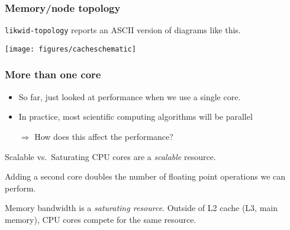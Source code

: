 \documentclass[presentation,aspectratio=43,10pt]{beamer}
\begin{document}
\begin{frame}
\begin{center}
  \end{center}
\end{frame}
\begin{frame}
  \frametitle{Memory/node topology}
  \texttt{likwid-topology} reports an ASCII version of diagrams like
  this.
  \begin{center}
    \texttt{[image: figures/cacheschematic]}
  \end{center}
\end{frame}

\begin{frame}
  \frametitle{More than one core}
  \begin{itemize}
  \item So far, just looked at performance when we use a single core.
  \item In practice, most scientific computing algorithms will be
    parallel
  \item[$\Rightarrow$] How does this affect the performance?
  \end{itemize}

  \begin{answer}{Scalable vs.~Saturating}
    CPU cores are a \emph{scalable} resource.

    Adding a second core doubles the number of floating point
    operations we can perform.

    Memory bandwidth is a \emph{saturating resource}. Outside of L2
    cache (L3, main memory), CPU cores compete for the same resource.
  \end{answer}
\end{frame}
\end{document}
